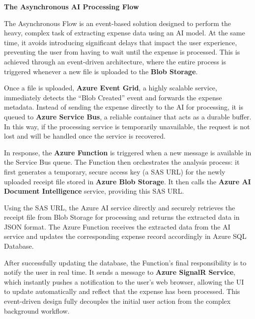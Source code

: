\vspace{0.5cm}

\textbf{The Asynchronous AI Processing Flow}

The Asynchronous Flow is an event-based solution designed to perform the heavy, complex task of extracting expense data using an AI model. At the same time, it avoids introducing significant delays that impact the user experience, preventing the user from having to wait until the expense is processed. This is achieved through an event-driven architecture, where the entire process is triggered whenever a new file is uploaded to the \textbf{Blob Storage}.

Once a file is uploaded, \textbf{Azure Event Grid}, a highly scalable service, immediately detects the ``Blob Created'' event and forwards the expense metadata. Instead of sending the expense directly to the AI for processing, it is queued to \textbf{Azure Service Bus}, a reliable container that acts as a durable buffer. In this way, if the processing service is temporarily unavailable, the request is not lost and will be handled once the service is recovered.

In response, the \textbf{Azure Function} is triggered when a new message is available in the Service Bus queue. The Function then orchestrates the analysis process: it first generates a temporary, secure access key (a SAS URL) for the newly uploaded receipt file stored in \textbf{Azure Blob Storage}. It then calls the \textbf{Azure AI Document Intelligence} service, providing this SAS URL.

Using the SAS URL, the Azure AI service directly and securely retrieves the receipt file from Blob Storage for processing and returns the extracted data in JSON format. The Azure Function receives the extracted data from the AI service and updates the corresponding expense record accordingly in Azure SQL Database. 

After successfully updating the database, the Function's final responsibility is to notify the user in real time. It sends a message to \textbf{Azure SignalR Service}, which instantly pushes a notification to the user's web browser, allowing the UI to update automatically and reflect that the expense has been processed. This event-driven design fully decouples the initial user action from the complex background workflow.
